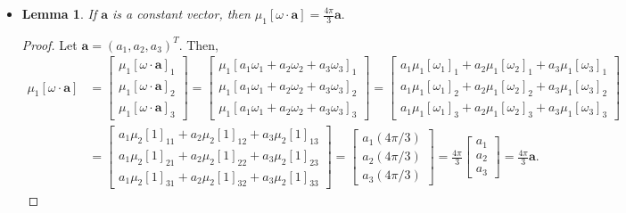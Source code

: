 \documentclass[10pt]{article}
\newtheorem{lemma}{Lemma}[section]
\newcommand{\ve}[1]{\mathbf{#1}}
\begin{document}
\begin{itemize}
      \item \begin{lemma}
        If $\ve a$ is a constant vector, then $\mu_1[\omega \cdot \ve a] = \frac{4\pi}{3}\ve a.$
      \end{lemma}      
      \begin{proof}
        Let $\ve a = (a_1, a_2, a_3)^T$. Then,        
        \begin{align*} 
          \mu_1 [\omega \cdot \ve a]
          &= \begin{bmatrix}
            \mu_1 [\omega \cdot \ve a]_1 \\
            \mu_1 [\omega \cdot \ve a]_2 \\
            \mu_1 [\omega \cdot \ve a]_3
          \end{bmatrix}
          = \begin{bmatrix}
            \mu_1 [a_1 \omega_1 + a_2 \omega_2 + a_3 \omega_3]_1 \\
            \mu_1 [a_1 \omega_1 + a_2 \omega_2 + a_3 \omega_3]_2 \\
            \mu_1 [a_1 \omega_1 + a_2 \omega_2 + a_3 \omega_3]_3
          \end{bmatrix}
          = \begin{bmatrix}
            a_1 \mu_1 [\omega_1 ]_1 + a_2 \mu_1 [\omega_2]_1 + a_3 \mu_1 [\omega_3]_1 \\
            a_1 \mu_1 [\omega_1 ]_2 + a_2 \mu_1 [\omega_2]_2 + a_3 \mu_1 [\omega_3]_2 \\
            a_1 \mu_1 [\omega_1 ]_3 + a_2 \mu_1 [\omega_2]_3 + a_3 \mu_1 [\omega_3]_3
          \end{bmatrix}\\
          &= \begin{bmatrix}
            a_1 \mu_2 [1]_{11} + a_2 \mu_2 [1]_{12} + a_3 \mu_2 [1]_{13} \\
            a_1 \mu_2 [1]_{21} + a_2 \mu_2 [1]_{22} + a_3 \mu_2 [1]_{23} \\
            a_1 \mu_2 [1]_{31} + a_2 \mu_2 [1]_{32} + a_3 \mu_2 [1]_{33}
          \end{bmatrix}
          = \begin{bmatrix}
            a_1 (4\pi/3) \\
            a_2 (4\pi/3) \\
            a_3 (4\pi/3)
          \end{bmatrix}
          = \frac{4\pi}{3} \begin{bmatrix}
            a_1 \\
            a_2\\
            a_3
          \end{bmatrix}
          = \frac{4\pi}{3}\ve a.
        \end{align*}
      \end{proof}
      

\end{itemize}
\end{document}

